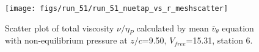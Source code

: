 \begin{figure}[H]
\centering
\texttt{[image: figs/run\_51/run\_51\_nuetap\_vs\_r\_meshscatter]}
\caption{Scatter plot of total viscosity $\nu / \eta_P$ calculated by mean $\bar{v}_{\theta}$ equation with non-equilibrium pressure at $z/c$=9.50, $V_{free}$=15.31, station 6.}
\label{fig:run_51_nuetap_vs_r_meshscatter}
\end{figure}


